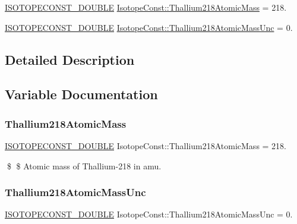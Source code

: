 \begin{DoxyCompactItemize}
\item 
\mbox{\hyperlink{group___isotope_const-_macros_ga8f45a7272ce02c0b4c65c44636ed719a}{I\+S\+O\+T\+O\+P\+E\+C\+O\+N\+S\+T\+\_\+\+D\+O\+U\+B\+LE}} \mbox{\hyperlink{group___isotope_const-_thallium-_tl218_gabb55467c4ac8b456ebde5c5aa7558aa0}{Isotope\+Const\+::\+Thallium218\+Atomic\+Mass}} = 218.
\item 
\mbox{\hyperlink{group___isotope_const-_macros_ga8f45a7272ce02c0b4c65c44636ed719a}{I\+S\+O\+T\+O\+P\+E\+C\+O\+N\+S\+T\+\_\+\+D\+O\+U\+B\+LE}} \mbox{\hyperlink{group___isotope_const-_thallium-_tl218_gaf79de1a64a3fa2cd1351fce50de85a31}{Isotope\+Const\+::\+Thallium218\+Atomic\+Mass\+Unc}} = 0.
\end{DoxyCompactItemize}


\subsection{Detailed Description}


\subsection{Variable Documentation}
\mbox{\label{group___isotope_const-_thallium-_tl218_gabb55467c4ac8b456ebde5c5aa7558aa0}} 
\subsubsection{\texorpdfstring{Thallium218\+Atomic\+Mass}{Thallium218AtomicMass}}
{\footnotesize\ttfamily \mbox{\hyperlink{group___isotope_const-_macros_ga8f45a7272ce02c0b4c65c44636ed719a}{I\+S\+O\+T\+O\+P\+E\+C\+O\+N\+S\+T\+\_\+\+D\+O\+U\+B\+LE}} Isotope\+Const\+::\+Thallium218\+Atomic\+Mass = 218.}

\$ \$ Atomic mass of Thallium-\/218 in amu. \mbox{\label{group___isotope_const-_thallium-_tl218_gaf79de1a64a3fa2cd1351fce50de85a31}} 
\subsubsection{\texorpdfstring{Thallium218\+Atomic\+Mass\+Unc}{Thallium218AtomicMassUnc}}
{\footnotesize\ttfamily \mbox{\hyperlink{group___isotope_const-_macros_ga8f45a7272ce02c0b4c65c44636ed719a}{I\+S\+O\+T\+O\+P\+E\+C\+O\+N\+S\+T\+\_\+\+D\+O\+U\+B\+LE}} Isotope\+Const\+::\+Thallium218\+Atomic\+Mass\+Unc = 0.}

